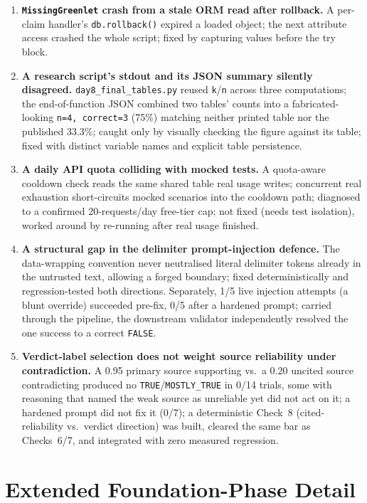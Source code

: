 \documentclass[conference]{IEEEtran}
\begin{document}
\begin{enumerate}
\item \textbf{\texttt{MissingGreenlet} crash from a stale ORM read after rollback.} A per-claim handler's \texttt{db.rollback()} expired a loaded object; the next attribute access crashed the whole script; fixed by capturing values before the try block.
\item \textbf{A research script's stdout and its JSON summary silently disagreed.} \texttt{day8\_final\_tables.py} reused \texttt{k}/\texttt{n} across three computations; the end-of-function JSON combined two tables' counts into a fabricated-looking \texttt{n{=}4, correct{=}3} (75\%) matching neither printed table nor the published 33.3\%; caught only by visually checking the figure against its table; fixed with distinct variable names and explicit table persistence.
\item \textbf{A daily API quota colliding with mocked tests.} A quota-aware cooldown check reads the same shared table real usage writes; concurrent real exhaustion short-circuits mocked scenarios into the cooldown path; diagnosed to a confirmed 20-requests/day free-tier cap; not fixed (needs test isolation), worked around by re-running after real usage finished.
\item \textbf{A structural gap in the delimiter prompt-injection defence.} The data-wrapping convention never neutralised literal delimiter tokens already in the untrusted text, allowing a forged boundary; fixed deterministically and regression-tested both directions. Separately, 1/5 live injection attempts (a blunt override) succeeded pre-fix, 0/5 after a hardened prompt; carried through the pipeline, the downstream validator independently resolved the one success to a correct \texttt{FALSE}.
\item \textbf{Verdict-label selection does not weight source reliability under contradiction.} A 0.95 primary source supporting vs.\ a 0.20 uncited source contradicting produced no \texttt{TRUE}/\texttt{MOSTLY\_TRUE} in 0/14 trials, some with reasoning that named the weak source as unreliable yet did not act on it; a hardened prompt did not fix it (0/7); a deterministic Check~8 (cited-reliability vs.\ verdict direction) was built, cleared the same bar as Checks~6/7, and integrated with zero measured regression.
\end{enumerate}

\section{Extended Foundation-Phase Detail}
\label{sec:appendixfoundation}
\end{document}
